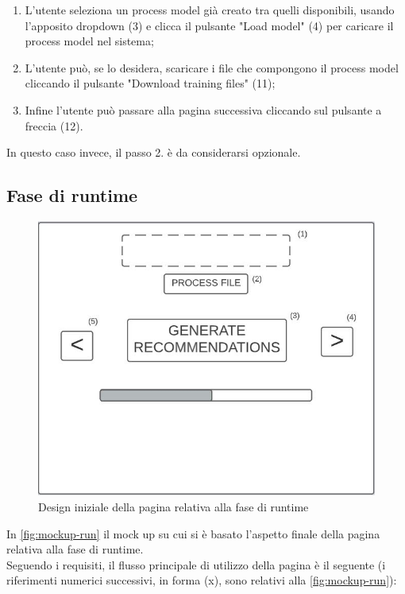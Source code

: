 \begin{enumerate}
\item L'utente seleziona un process model già creato tra quelli disponibili, usando l'apposito \gls{dropdown} (3) e clicca il pulsante "Load model" (4) per caricare il process model nel sistema;

\item L'utente può, se lo desidera, scaricare i file che compongono il process model cliccando il pulsante "Download training files" (11); 

\item Infine l'utente può passare alla pagina successiva cliccando sul pulsante a freccia (12).

\end{enumerate}

In questo caso invece, il passo 2. è da considerarsi opzionale.


\subsection{Fase di runtime}
\label{subsec:training}

\begin{figure}[!h] 
    \centering 
    \includegraphics[width=0.8\columnwidth]{immagini/mockup-run.jpg} 
    \caption{Design iniziale della pagina relativa alla fase di runtime}
    \label{fig:mockup-run}
\end{figure}

In \autoref{fig:mockup-run} il mock up su cui si è basato l'aspetto finale della pagina relativa alla fase di runtime.
\\
Seguendo i requisiti, il flusso principale di utilizzo della pagina è il seguente (i riferimenti numerici successivi, in forma (x), sono relativi alla \autoref{fig:mockup-run}):


